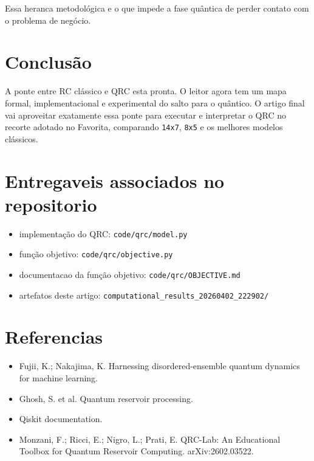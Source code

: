 \documentclass[12pt]{article}
\providecommand{\tightlist}{%
          \setlength{\itemsep}{0pt}\setlength{\parskip}{0pt}}
\begin{document}
Essa heranca metodológica e o que impede a fase quântica de perder contato com o problema de negócio.

\section{Conclusão}\label{10-conclusuxe3o}

A ponte entre RC clássico e QRC esta pronta. O leitor agora tem um mapa formal, implementacional e experimental do salto para o quântico. O artigo final vai aproveitar exatamente essa ponte para executar e interpretar o QRC no recorte adotado no Favorita, comparando \texttt{14x7}, \texttt{8x5} e os melhores modelos clássicos.

\section{Entregaveis associados no repositorio}\label{entregaveis-associados-no-repositorio}

\begin{itemize}
\tightlist
\item
  implementação do QRC: \texttt{code/qrc/model.py}
\item
  função objetivo: \texttt{code/qrc/objective.py}
\item
  documentacao da função objetivo: \texttt{code/qrc/OBJECTIVE.md}
\item
  artefatos deste artigo: \texttt{computational\_results\_20260402\_222902/}
\end{itemize}

\section{Referencias}\label{referencias}

\begin{itemize}
\tightlist
\item
  Fujii, K.; Nakajima, K. Harnessing disordered-ensemble quantum dynamics for machine learning.
\item
  Ghosh, S. et al. Quantum reservoir processing.
\item
  Qiskit documentation.
\item
  Monzani, F.; Ricci, E.; Nigro, L.; Prati, E. QRC-Lab: An Educational Toolbox for Quantum Reservoir Computing. arXiv:2602.03522.
\end{itemize}

        
\end{document}
